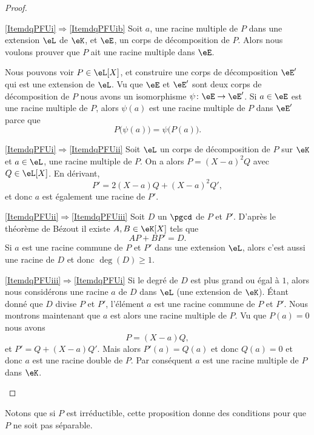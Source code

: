 \begin{proof}
    \begin{subproof}
    \item[\ref{ItemdqPFUi}\( \Rightarrow\)\ref{ItemdqPFUib}] Soit \( a\), une racine multiple de \( P\) dans une extension \( \eL\) de \( \eK\), et \( \eE\), un corps de décomposition de \( P\). Alors nous voulons prouver que \( P\) ait une racine multiple dans \( \eE\).

        Nous pouvons voir \( P\in \eL[X]\), et construire une corps de décomposition \( \eE'\) qui est une extension de \( \eL\). Vu que \( \eE\) et \( \eE'\) sont deux corps de décomposition de \( P\) 
        nous avons un isomorphisme \( \psi\colon \eE\to \eE'\). Si \( a\in \eE\) est une racine multiple de \( P\), alors \( \psi(a)\) est une racine multiple de \( P\) dans \( \eE'\) parce que
        \begin{equation}
            P\big( \psi(a) \big)=\psi\big( P(a) \big).
        \end{equation}
    \item[\ref{ItemdqPFUi}\( \Rightarrow\)\ref{ItemdqPFUii}] Soit \( \eL\) un corps de décomposition de \( P\) sur \( \eK\) et \( a\in \eL\), une racine multiple de \( P\). On a alors \( P=(X-a)^2Q\) avec \( Q\in \eL[X]\). En dérivant,
        \begin{equation}
            P'=2(X-a)Q+(X-a)^2Q',
        \end{equation}
        et donc \( a\) est également une racine de \( P'\).
    \item[\ref{ItemdqPFUii}\( \Rightarrow\)\ref{ItemdqPFUiii}] Soit \( D\) un \( \pgcd\) de \( P\) et \( P'\). D'après le théorème de Bézout il existe \( A,B\in \eK[X]\) tels que 
        \begin{equation}
            AP+BP'=D.
        \end{equation}
        Si \( a\) est une racine commune de \( P\) et \( P'\) dans une extension \( \eL\), alors c'est aussi une racine de \( D\) et donc \( \deg(D)\geq 1\).
    \item[\ref{ItemdqPFUiii}\(\Rightarrow\)\ref{ItemdqPFUi}] Si le degré de \( D\) est plus grand ou égal à \( 1\), alors nous considérons une racine \( a\) de \( D\) dans \( \eL\) (une extension de \( \eK\)). Étant donné que \( D\) divise \( P\) et \( P'\), l'élément \( a\) est une racine commune de \( P\) et \( P'\). Nous montrons maintenant que \( a\) est alors une racine multiple de \( P\). Vu que \( P(a)=0\) nous avons
        \begin{equation}
            P=(X-a)Q,
        \end{equation}
        et \( P'=Q+(X-a)Q'\). Mais alors \( P'(a)=Q(a)\) et donc \( Q(a)=0\) et donc \( a\) est une racine double de \( P\). Par conséquent \( a\) est une racine multiple de \( P\) dans \( \eK\).
    \end{subproof}
\end{proof}
Notons que si \( P\) est irréductible, cette proposition donne des conditions pour que \( P\) ne soit pas séparable.

